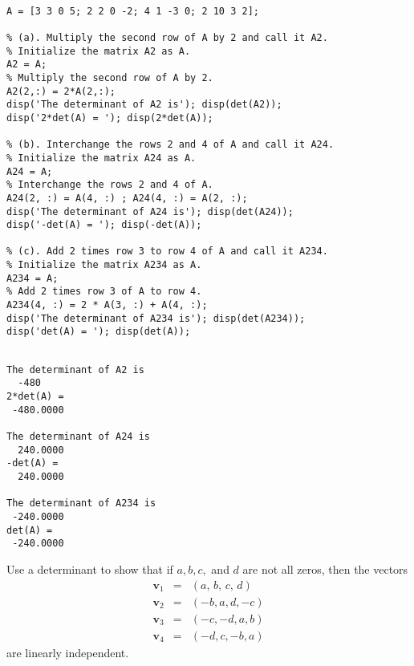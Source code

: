 \begin{sol}
\begin{verbatim}

A = [3 3 0 5; 2 2 0 -2; 4 1 -3 0; 2 10 3 2];

% (a). Multiply the second row of A by 2 and call it A2.
% Initialize the matrix A2 as A.
A2 = A; 
% Multiply the second row of A by 2.
A2(2,:) = 2*A(2,:);
disp('The determinant of A2 is'); disp(det(A2));
disp('2*det(A) = '); disp(2*det(A));

% (b). Interchange the rows 2 and 4 of A and call it A24.
% Initialize the matrix A24 as A.
A24 = A; 
% Interchange the rows 2 and 4 of A.
A24(2, :) = A(4, :) ; A24(4, :) = A(2, :);
disp('The determinant of A24 is'); disp(det(A24));
disp('-det(A) = '); disp(-det(A));

% (c). Add 2 times row 3 to row 4 of A and call it A234.
% Initialize the matrix A234 as A.
A234 = A; 
% Add 2 times row 3 of A to row 4.
A234(4, :) = 2 * A(3, :) + A(4, :); 
disp('The determinant of A234 is'); disp(det(A234));
disp('det(A) = '); disp(det(A));
\end{verbatim}

\begin{outputs}

\begin{verbatim}

The determinant of A2 is
  -480
2*det(A) =
 -480.0000

The determinant of A24 is
  240.0000
-det(A) =
  240.0000

The determinant of A234 is
 -240.0000
det(A) =
 -240.0000
\end{verbatim}
\end{outputs}
\end{sol}


\vspace{3mm}

\begin{exer} Use a determinant to show that if $a, b, c,$ and $d$ are not all zeros, then the vectors
\begin{eqnarray*}
\mathbf{v}_{1}&=&(a,\, b,\, c,\, d)\\
\mathbf{v}_{2}&=&(-b, a, d, -c)\\
\mathbf{v}_{3}&=&(-c, -d, a, b)\\
\mathbf{v}_{4}&=&(-d, c, -b, a)
\end{eqnarray*}
are linearly independent.
\end{exer}

